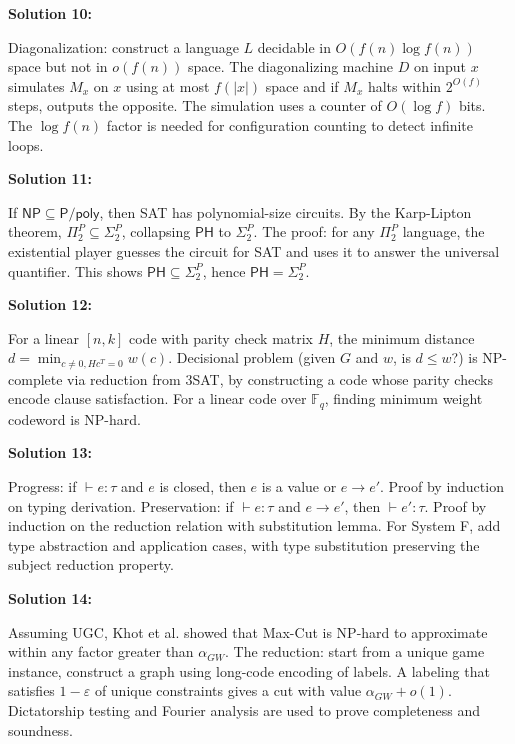 \documentclass[12pt,a4paper]{exam}
\begin{document}
\vspace{0.5cm}

\textbf{Solution 10:}

Diagonalization: construct a language $L$ decidable in $O(f(n)\log f(n))$ space but not in $o(f(n))$ space. The diagonalizing machine $D$ on input $x$ simulates $M_x$ on $x$ using at most $f(|x|)$ space and if $M_x$ halts within $2^{O(f)}$ steps, outputs the opposite. The simulation uses a counter of $O(\log f)$ bits. The $\log f(n)$ factor is needed for configuration counting to detect infinite loops.

\vspace{0.5cm}

\textbf{Solution 11:}

If $\mathsf{NP} \subseteq \mathsf{P}/\mathsf{poly}$, then SAT has polynomial-size circuits. By the Karp-Lipton theorem, $\Pi_2^P \subseteq \Sigma_2^P$, collapsing $\mathsf{PH}$ to $\Sigma_2^P$. The proof: for any $\Pi_2^P$ language, the existential player guesses the circuit for SAT and uses it to answer the universal quantifier. This shows $\mathsf{PH} \subseteq \Sigma_2^P$, hence $\mathsf{PH} = \Sigma_2^P$.

\vspace{0.5cm}

\textbf{Solution 12:}

For a linear $[n,k]$ code with parity check matrix $H$, the minimum distance $d = \min_{c \neq 0, Hc^T=0} w(c)$. Decisional problem (given $G$ and $w$, is $d \leq w$?) is NP-complete via reduction from 3SAT, by constructing a code whose parity checks encode clause satisfaction. For a linear code over $\mathbb{F}_q$, finding minimum weight codeword is NP-hard.

\vspace{0.5cm}

\textbf{Solution 13:}

Progress: if $\vdash e: \tau$ and $e$ is closed, then $e$ is a value or $e \to e'$. Proof by induction on typing derivation. Preservation: if $\vdash e: \tau$ and $e \to e'$, then $\vdash e': \tau$. Proof by induction on the reduction relation with substitution lemma. For System F, add type abstraction and application cases, with type substitution preserving the subject reduction property.

\vspace{0.5cm}

\textbf{Solution 14:}

Assuming UGC, Khot et al. showed that Max-Cut is NP-hard to approximate within any factor greater than $\alpha_{GW}$. The reduction: start from a unique game instance, construct a graph using long-code encoding of labels. A labeling that satisfies $1-\varepsilon$ of unique constraints gives a cut with value $\alpha_{GW} + o(1)$. Dictatorship testing and Fourier analysis are used to prove completeness and soundness.
\end{document}
